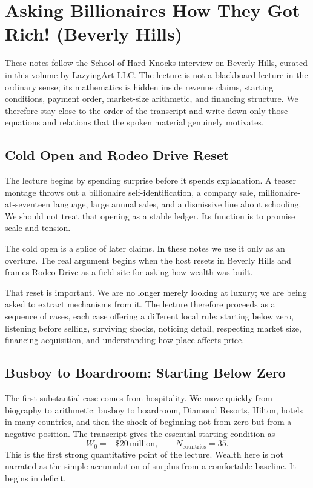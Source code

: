 \chapter{Asking Billionaires How They Got Rich! (Beverly Hills)}

These notes follow the School of Hard Knocks interview on Beverly Hills, curated in this volume by LazyingArt LLC. The lecture is not a blackboard lecture in the ordinary sense; its mathematics is hidden inside revenue claims, starting conditions, payment order, market-size arithmetic, and financing structure. We therefore stay close to the order of the transcript and write down only those equations and relations that the spoken material genuinely motivates.

\section{Cold Open and Rodeo Drive Reset}

The lecture begins by spending surprise before it spends explanation. A teaser montage throws out a billionaire self-identification, a company sale, millionaire-at-seventeen language, large annual sales, and a dismissive line about schooling. We should not treat that opening as a stable ledger. Its function is to promise scale and tension.

\begin{remark}
The cold open is a splice of later claims. In these notes we use it only as an overture. The real argument begins when the host resets in Beverly Hills and frames Rodeo Drive as a field site for asking how wealth was built.
\end{remark}

That reset is important. We are no longer merely looking at luxury; we are being asked to extract mechanisms from it. The lecture therefore proceeds as a sequence of cases, each case offering a different local rule: starting below zero, listening before selling, surviving shocks, noticing detail, respecting market size, financing acquisition, and understanding how place affects price.

\section{Busboy to Boardroom: Starting Below Zero}

The first substantial case comes from hospitality. We move quickly from biography to arithmetic: busboy to boardroom, Diamond Resorts, Hilton, hotels in many countries, and then the shock of beginning not from zero but from a negative position. The transcript gives the essential starting condition as
\begin{equation}
W_0 = -\$20\,\text{million}, \qquad N_{\text{countries}} = 35.
\end{equation}
This is the first strong quantitative point of the lecture. Wealth here is not narrated as the simple accumulation of surplus from a comfortable baseline. It begins in deficit.

